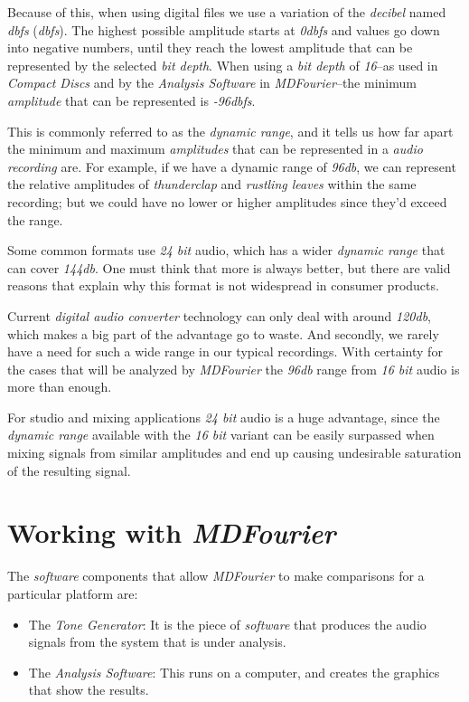 \documentclass[10pt,a4paper]{report}
\newcommand{\define}[1]{\textit{\acrlong{#1}} (\textit{\acrshort{#1}})}
\newcommand{\db}[1]{\textit{\mbox{#1\acrshort{dbfs}}}}
\newcommand{\dbSPL}[1]{\textit{\mbox{#1\acrshort{db}}}}
\begin{document}
Because of this, when using digital files we use a variation of the \textit{decibel} named \define{dbfs}. The highest possible amplitude starts at \db{0} and values go down into negative numbers, until they reach the lowest amplitude that can be represented by the selected \textit{bit depth}. When using a \textit{bit depth} of \textit{16}--as used in \textit{Compact Discs} and by the \textit{Analysis Software} in \textit{MDFourier}--the minimum \textit{amplitude} that can be represented is \db{-96}.

This is commonly referred to as the \textit{dynamic range}, and it tells us how far apart the minimum and maximum \textit{amplitudes} that can be represented in a \textit{audio recording} are. For example, if we have a dynamic range of \dbSPL{96}, we can represent the relative amplitudes of \textit{thunderclap} and \textit{rustling leaves} within the same recording; but we could have no lower or higher amplitudes since they'd exceed the range.

Some common formats use \textit{24 bit} audio, which has a wider \textit{dynamic range} that can cover \dbSPL{144}. One must think that more is always better, but there are valid reasons that explain why this format is not widespread in consumer products.

Current \textit{digital audio converter} technology can only deal with around \dbSPL{120}, which makes a big part of the advantage go to waste. And secondly, we rarely have a need for such a wide range in our typical recordings. With certainty for the cases that will be analyzed by \textit{MDFourier} the \dbSPL{96} range from \textit{16 bit} audio is more than enough. 

For studio and mixing applications \textit{24 bit} audio is a huge advantage, since the \textit{dynamic range} available with the \textit{16 bit} variant can be easily surpassed when mixing signals from similar amplitudes and end up causing undesirable saturation of the resulting signal.


\chapter{Working with \textit{MDFourier}}
\label{workflow}

The \textit{software} components that allow \textit{MDFourier} to make comparisons for a particular platform are:

\begin{itemize}
	\item The \textit{Tone Generator}: It is the piece of \textit{software} that produces the audio signals from the system that is under analysis. 
	\item The \textit{Analysis Software}: This runs on a computer, and creates the graphics that show the results. 
\end{itemize}
\end{document}
